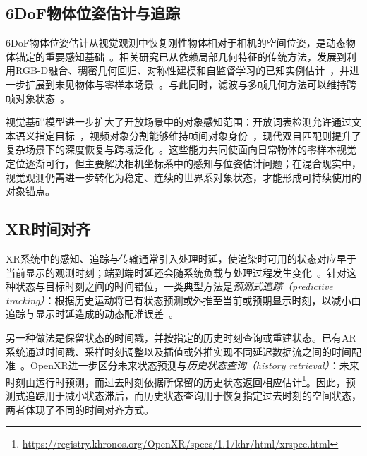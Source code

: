 \documentclass[review]{vgtc}
\begin{document}
\subsection{6DoF物体位姿估计与追踪}

6DoF物体位姿估计从视觉观测中恢复刚性物体相对于相机的空间位姿，是动态物体锚定的重要感知基础~\cite{aguirrezabal2026survey}。相关研究已从依赖局部几何特征的传统方法，发展到利用RGB-D融合、稠密几何回归、对称性建模和自监督学习的已知实例估计~\cite{densefusion2019,epos2020,gdrnet2021,self6d2020}，并进一步扩展到未见物体与零样本场景~\cite{gen6d2022,megapose2022,gigapose2024,lin2024sam6d,ornek2024foundpose,moon2024genflow,moon2025coop,foundationpose2024}。与此同时，滤波与多帧几何方法可以维持跨帧对象状态~\cite{poserbpf2021,bundletrack2021}。

视觉基础模型进一步扩大了开放场景中的对象感知范围：开放词表检测允许通过文本语义指定目标~\cite{owlvit2022,glip2022,groundingdino2025,yoloe2025}，视频对象分割能够维持帧间对象身份~\cite{xmem2022,cutie2024}，现代双目匹配则提升了复杂场景下的深度恢复与跨域泛化~\cite{raftstereo2021,igevstereo2023,foundationstereo2025}。这些能力共同使面向日常物体的零样本视觉定位逐渐可行，但主要解决相机坐标系中的感知与位姿估计问题；在混合现实中，视觉观测仍需进一步转化为稳定、连续的世界系对象状态，才能形成可持续使用的对象锚点。

\subsection{XR时间对齐}

XR系统中的感知、追踪与传输通常引入处理时延，使渲染时可用的状态对应早于当前显示的观测时刻；端到端时延还会随系统负载与处理过程发生变化~\cite{diluca2010latency,mrloop2022,stauffert2020mtp}。针对这种状态与目标时刻之间的时间错位，一类典型方法是\emph{预测式追踪（predictive tracking）}：根据历史运动将已有状态预测或外推至当前或预期显示时刻，以减小由追踪与显示时延造成的动态配准误差~\cite{azuma1994improving,laviola2003double,pvt2023,yoon2022headmotion}。

另一种做法是保留状态的时间戳，并按指定的历史时刻查询或重建状态。已有AR系统通过时间戳、采样时刻调整以及插值或外推实现不同延迟数据流之间的时间配准~\cite{jacobs1997latency}。OpenXR进一步区分未来状态预测与\emph{历史状态查询（history retrieval）}：未来时刻由运行时预测，而过去时刻依据所保留的历史状态返回相应估计\footnote{\url{https://registry.khronos.org/OpenXR/specs/1.1/khr/html/xrspec.html}}。因此，预测式追踪用于减小状态滞后，而历史状态查询用于恢复指定过去时刻的空间状态，两者体现了不同的时间对齐方式。
\end{document}
